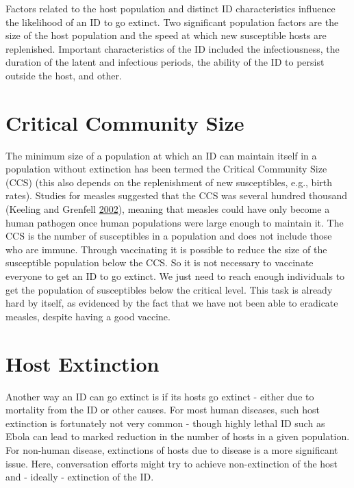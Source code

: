 \documentclass[
]{book}
\begin{document}
Factors related to the host population and distinct ID characteristics influence the likelihood of an ID to go extinct. Two significant population factors are the size of the host population and the speed at which new susceptible hosts are replenished. Important characteristics of the ID included the infectiousness, the duration of the latent and infectious periods, the ability of the ID to persist outside the host, and other.

\hypertarget{critical-community-size}{%
\section{Critical Community Size}\label{critical-community-size}}

The minimum size of a population at which an ID can maintain itself in a population without extinction has been termed the Critical Community Size (CCS) (this also depends on the replenishment of new susceptibles, e.g., birth rates). Studies for measles suggested that the CCS was several hundred thousand (Keeling and Grenfell \protect\hyperlink{ref-keeling02}{2002}), meaning that measles could have only become a human pathogen once human populations were large enough to maintain it. The CCS is the number of susceptibles in a population and does not include those who are immune. Through vaccinating it is possible to reduce the size of the susceptible population below the CCS. So it is not necessary to vaccinate everyone to get an ID to go extinct. We just need to reach enough individuals to get the population of susceptibles below the critical level. This task is already hard by itself, as evidenced by the fact that we have not been able to eradicate measles, despite having a good vaccine.

\hypertarget{host-extinction}{%
\section{Host Extinction}\label{host-extinction}}

Another way an ID can go extinct is if its hosts go extinct - either due to mortality from the ID or other causes.
For most human diseases, such host extinction is fortunately not very common - though highly lethal ID such as Ebola can lead to marked reduction in the number of hosts in a given population. For non-human disease, extinctions of hosts due to disease is a more significant issue. Here, conversation efforts might try to achieve non-extinction of the host and - ideally - extinction of the ID.
\end{document}
